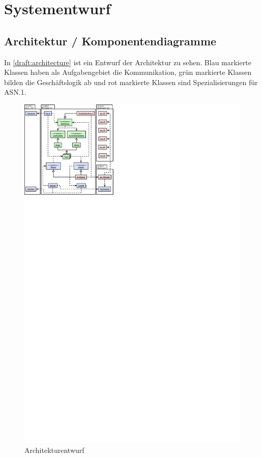 
\chapter{Systementwurf}


\section{Architektur / Komponentendiagramme}
		
In \autoref{draft:architecture} ist ein Entwurf der Architektur zu sehen.
Blau markierte Klassen haben als Aufgabengebiet die Kommunikation, grün markierte Klassen bilden die Geschäftslogik ab und rot markierte Klassen sind Spezialisierungen für ASN.1.


\begin{figure}[H]
	\centering
	\includegraphics[width=2.0\textwidth]{dia/architecture}
	\caption{Architekturentwurf}
	\label{draft:architecture}
\end{figure}

